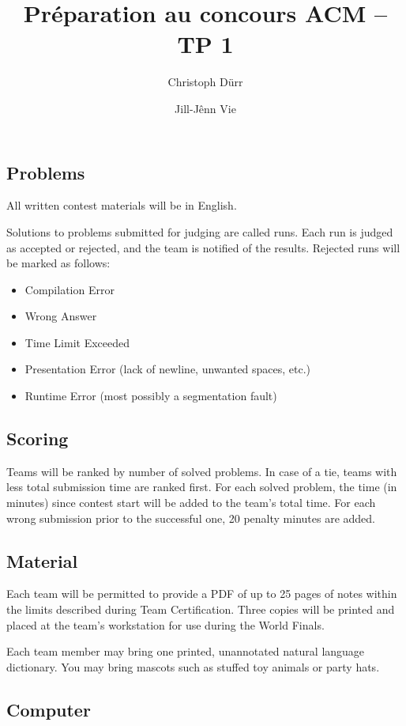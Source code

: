 \documentclass[12pt]{article}
\title{Préparation au concours ACM -- TP 1}
\author{Christoph Dürr \and Jill-Jênn Vie}
\begin{document}
\maketitle
\subsection*{Problems}

All written contest materials will be in English.

Solutions to problems submitted for judging are called runs. Each run is judged as accepted or rejected, and the team is notified of the results. Rejected runs will be marked as follows:
\begin{itemize}
\item Compilation Error
\item Wrong Answer
\item Time Limit Exceeded
\item Presentation Error (lack of newline, unwanted spaces, etc.)
\item Runtime Error (most possibly a segmentation fault)
\end{itemize}

\subsection*{Scoring}

Teams will be ranked by number of solved problems. In case of a tie, teams with less total submission time are ranked first. For each solved problem, the time (in minutes) since contest start will be added to the team's total time. For each wrong submission prior to the successful one, 20 penalty minutes are added.

\subsection*{Material}

Each team will be permitted to provide a PDF of up to 25 pages of notes within the limits described during Team Certification. Three copies will be printed and placed at the team's workstation for use during the World Finals.

Each team member may bring one printed, unannotated natural language dictionary. You may bring mascots such as stuffed toy animals or party hats.

\subsection*{Computer}
\end{document}
